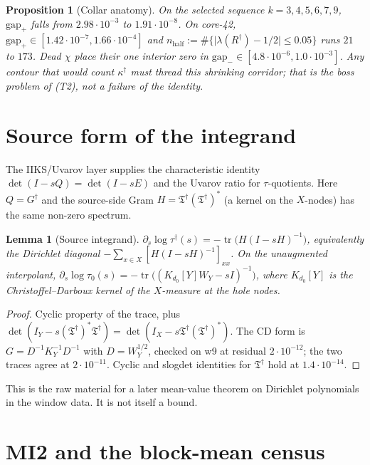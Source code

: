 \documentclass[11pt]{article}
\newtheorem{lemma}{Lemma}
\newtheorem{prop}{Proposition}
\theoremstyle{remark}
\newcommand{\Rd}{R^{\dagger}}
\newcommand{\Td}{\mathfrak{T}^{\dagger}}
\newcommand{\Gd}{G^{\dagger}}
\newcommand{\taud}{\tau^{\dagger}}
\newcommand{\kapd}{\kappa^{\dagger}}
\begin{document}
\begin{prop}[Collar anatomy]\label{prop:collar}
On the selected sequence $k=3,4,5,6,7,9$,
$\mathrm{gap}_{+}$ falls from $2.98\cdot 10^{-3}$ to
$1.91\cdot 10^{-8}$.
On core-42, $\mathrm{gap}_{+}\in[1.42\cdot 10^{-7},1.66\cdot 10^{-4}]$
and $n_{\mathrm{half}}:=\#\{\lvert\lambda(\Rd)-1/2\rvert\le 0.05\}$
runs $21$ to $173$.
Dead $\chi$ place their one interior zero in
$\mathrm{gap}_{-}\in[4.8\cdot 10^{-6},1.0\cdot 10^{-3}]$.
Any contour that would count $\kapd$ must thread this
shrinking corridor; that is the boss problem of (T2), not a
failure of the identity.
\end{prop}

\section{Source form of the integrand}\label{sec:src}

The IIKS/Uvarov layer supplies the characteristic identity
$\det(I-sQ)=\det(I-sE)$ and the Uvarov ratio for $\tau$-quotients.
Here $Q=\Gd$ and the source-side Gram $H=\Td(\Td)^{*}$ (a kernel
on the $X$-nodes) has the same non-zero spectrum.

\begin{lemma}[Source integrand]\label{lem:src}
$\partial_{s}\log\taud(s)=-\operatorname{tr}\bigl(H(I-sH)^{-1}\bigr)$,
equivalently the Dirichlet diagonal
$-\sum_{x\in X}[H(I-sH)^{-1}]_{xx}$.
On the unaugmented interpolant,
$\partial_{s}\log\tau_{0}(s)=-\operatorname{tr}\bigl((K_{d_{0}}[Y]W_{Y}-sI)^{-1}\bigr)$,
where $K_{d_{0}}[Y]$ is the Christoffel--Darboux kernel of the
$X$-measure at the hole nodes.
\end{lemma}

\begin{proof}
Cyclic property of the trace, plus
$\det(I_{Y}-s(\Td)^{*}\Td)=\det(I_{X}-s\Td(\Td)^{*})$.
The CD form is $G=D^{-1}K_{Y}^{-1}D^{-1}$ with $D=W_{Y}^{1/2}$,
checked on w9 at residual $2\cdot 10^{-12}$; the two traces
agree at $2\cdot 10^{-11}$.
Cyclic and slogdet identities for $\Td$ hold at $1.4\cdot 10^{-14}$.
\end{proof}

This is the raw material for a later mean-value theorem on
Dirichlet polynomials in the window data.  It is not itself a
bound.

\section{MI2 and the block-mean census}\label{sec:mi2}
\end{document}

